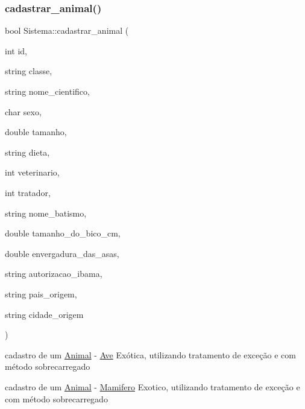 \subsubsection{\texorpdfstring{cadastrar\_animal()}{cadastrar\_animal()}\hspace{0.1cm}{\footnotesize\ttfamily [6/12]}}
{\footnotesize\ttfamily bool Sistema\+::cadastrar\+\_\+animal (\begin{DoxyParamCaption}\item[{int}]{id,  }\item[{string}]{classe,  }\item[{string}]{nome\+\_\+cientifico,  }\item[{char}]{sexo,  }\item[{double}]{tamanho,  }\item[{string}]{dieta,  }\item[{int}]{veterinario,  }\item[{int}]{tratador,  }\item[{string}]{nome\+\_\+batismo,  }\item[{double}]{tamanho\+\_\+do\+\_\+bico\+\_\+cm,  }\item[{double}]{envergadura\+\_\+das\+\_\+asas,  }\item[{string}]{autorizacao\+\_\+ibama,  }\item[{string}]{pais\+\_\+origem,  }\item[{string}]{cidade\+\_\+origem }\end{DoxyParamCaption})}



cadastro de um \mbox{\hyperlink{class_animal}{Animal}} -\/ \mbox{\hyperlink{class_ave}{Ave}} Exótica, utilizando tratamento de exceção e com método sobrecarregado 

cadastro de um \mbox{\hyperlink{class_animal}{Animal}} -\/ \mbox{\hyperlink{class_mamifero}{Mamifero}} Exotico, utilizando tratamento de exceção e com método sobrecarregado \mbox{\label{class_sistema_a5b55e20b1440ad96bf7182a679d5f0fe}} 
